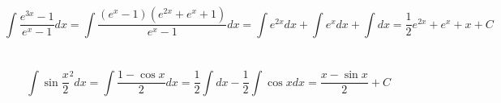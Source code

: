 \documentclass{article}
\begin{document}
\begin{center}
        \section{}
            \[\int \frac{e^{3x} - 1}{e^x - 1}dx =
            \int \frac{(e^x - 1)(e^{2x} + e^x + 1)}{e^x - 1}dx
            = \int e^{2x}dx + \int e^x dx + \int dx = 
            \frac{1}{2} e^{2x} + e^x + x + C\]
            
        \section{}
            \[\int \sin{\frac{x}{2}}^2 dx = \int \frac{1 - \cos{x}}{2}dx =
            \frac{1}{2} \int dx - \frac{1}{2} \int \cos{x}dx =
            \frac{x - \sin{x}}{2} + C\]      

        \end{center}
\end{document}
